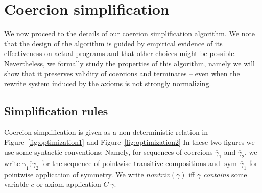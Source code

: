 \documentclass[a4paper,UKenglish]{lipics}
\newcommand{\dv}[1]{{\bf DV:}\begin{color}{red} #1 \end{color}}
\newcommand{\ol}[1]{\overline{#1}}
\newcommand{\sym}[1]{\mathop{sym}\, #1}
\newcommand{\gammas}{\ol{\gamma}}
\begin{document}


\section{Coercion simplification}\label{s:normalization}
\newcommand{\G}{{\cal G}}

We now proceed to the details of our coercion simplification algorithm. We note that the design of the algorithm
is guided by empirical evidence of its effectiveness on actual programs and that other choices might be possible.
Nevertheless, we formally study the properties of this algorithm, namely we will show that it preserves validity 
of coercions and terminates -- even when the rewrite system induced by the axioms is not strongly normalizing.

\subsection{Simplification rules}\label{ssect:rules}

Coercion simplification is given as a non-deterministic relation in Figure~\ref{fig:optimization1} and Figure~\ref{fig:optimization2}
In these two figures we use some syntactic conventions: Namely, for sequences of coercions $\gammas_1$ and $\gammas_2$, 
we write $\ol{\gamma_1;\gamma_2}$ for the sequence of pointwise transitive compositions and $\sym{\gammas_1}$ for pointwise 
application of symmetry. We write $nontriv(\gamma)$ iff $\gamma$ {\em contains} some variable $c$ or axiom application $C\;\gammas$.
\end{document}
